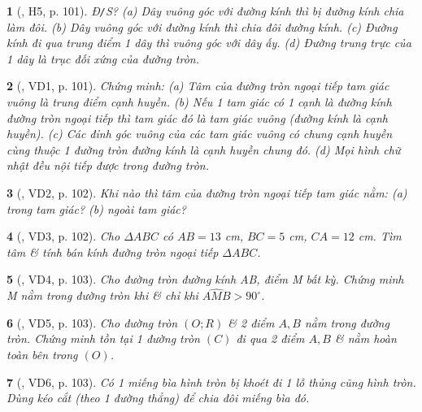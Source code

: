 \documentclass{article}
\newtheorem{baitoan}{}
\begin{document}
\begin{baitoan}[\cite{Binh_boi_duong_Toan_9_tap_1}, H5, p. 101]
	{\rm Đ{\tt/}S?} (a) Dây vuông góc với đường kính thì bị đường kính chia làm đôi. (b) Dây vuông góc với đường kính thì chia đôi đường kính. (c) Đường kính đi qua trung điểm 1 dây thì vuông góc với dây ấy. (d) Đường trung trực của 1 dây là trục đối xứng của đường tròn.
\end{baitoan}

\begin{baitoan}[\cite{Binh_boi_duong_Toan_9_tap_1}, VD1, p. 101]
	Chứng minh: (a) Tâm của đường tròn ngoại tiếp tam giác vuông là trung điểm cạnh huyền. (b) Nếu 1 tam giác có 1 cạnh là đường kính đường tròn ngoại tiếp thì tam giác đó là tam giác vuông (đường kính là cạnh huyền). (c) Các đỉnh góc vuông của các tam giác vuông có chung cạnh huyền cùng thuộc 1 đường tròn đường kính là cạnh huyền chung đó. (d) Mọi hình chữ nhật đều nội tiếp được trong đường tròn.
\end{baitoan}

\begin{baitoan}[\cite{Binh_boi_duong_Toan_9_tap_1}, VD2, p. 102]
	Khi nào thì tâm của đường tròn ngoại tiếp tam giác nằm: (a) trong tam giác? (b) ngoài tam giác?
\end{baitoan}

\begin{baitoan}[\cite{Binh_boi_duong_Toan_9_tap_1}, VD3, p. 102]
	Cho $\Delta ABC$ có $AB = 13$ {\rm cm}, $BC = 5$ {\rm cm}, $CA = 12$ {\rm cm}. Tìm tâm \& tính bán kính đường tròn ngoại tiếp $\Delta ABC$.
\end{baitoan}

\begin{baitoan}[\cite{Binh_boi_duong_Toan_9_tap_1}, VD4, p. 103]
	Cho đường tròn đường kính AB, điểm M bất kỳ. Chứng minh M nằm trong đường tròn khi \& chỉ khi $\widehat{AMB} > 90^\circ$.
\end{baitoan}

\begin{baitoan}[\cite{Binh_boi_duong_Toan_9_tap_1}, VD5, p. 103]
	Cho đường tròn $(O;R)$ \& 2 điểm $A,B$ nằm trong đường tròn. Chứng minh tồn tại 1 đường tròn $(C)$ đi qua 2 điểm $A,B$ \& nằm hoàn toàn bên trong $(O)$.
\end{baitoan}

\begin{baitoan}[\cite{Binh_boi_duong_Toan_9_tap_1}, VD6, p. 103]
	Có 1 miếng bìa hình tròn bị khoét đi 1 lỗ thủng cũng hình tròn. Dùng kéo cắt (theo 1 đường thẳng) để chia đôi miếng bìa đó.
\end{baitoan}
\end{document}
